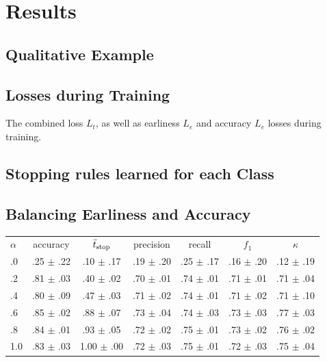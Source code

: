 \documentclass[a0]{tumposter}
\begin{document}
\begin{minipage}[t]{.32\textwidth}
	\section{Results}
	
	\subsection{Qualitative Example}
	
	
	
	\subsection{Losses during Training}
	
	The combined loss $L_t$, as well as earliness $L_e$ and accuracy $L_e$ losses during training.
	
	
	\figearlyreward
	
	\subsection{Stopping rules learned for each Class}
	
	
	
	\subsection{Balancing Earliness and Accuracy}
	\begin{table}
		
		\scriptsize
		\hspace{0em}\begin{tabular}{lcccccc}
			\toprule\small
			\textbf{$\alpha$} & accuracy & $\bar{t}_\text{stop}$  & precision & recall & $f_1$ & $\kappa$ \\
			\cmidrule(lr){0-0}\cmidrule(lr){1-1}\cmidrule(lr){2-2}\cmidrule(lr){3-3}\cmidrule(lr){4-4}\cmidrule(lr){5-5}\cmidrule(lr){6-6}\cmidrule(lr){7-7}
			.0 & .25 $\pm$ .22 & .10 $\pm$ .17 & .19 $\pm$ .20 & .25 $\pm$ .17 & .16 $\pm$ .20 & .12 $\pm$ .19 \\
			.2 & .81 $\pm$ .03 & .40 $\pm$ .02 & .70 $\pm$ .01 & .74 $\pm$ .01 & .71 $\pm$ .01 & .71 $\pm$ .04 \\
			.4 & .80 $\pm$ .09 & .47 $\pm$ .03 & .71 $\pm$ .02 & .74 $\pm$ .01 & .71 $\pm$ .02 & .71 $\pm$ .10 \\
			.6 & .85 $\pm$ .02 & .88 $\pm$ .07 & .73 $\pm$ .04 & .74 $\pm$ .03 & .73 $\pm$ .03 & .77 $\pm$ .03 \\
			.8 & .84 $\pm$ .01 & .93 $\pm$ .05 & .72 $\pm$ .02 & .75 $\pm$ .01 & .73 $\pm$ .02 & .76 $\pm$ .02 \\
			1.0 & .83 $\pm$ .03 & 1.00 $\pm$ .00 & .72 $\pm$ .03 & .75 $\pm$ .01 & .72 $\pm$ .03 & .75 $\pm$ .04 \\
			\bottomrule
		\end{tabular}
	

\end{table}
\end{minipage}
\end{document}
